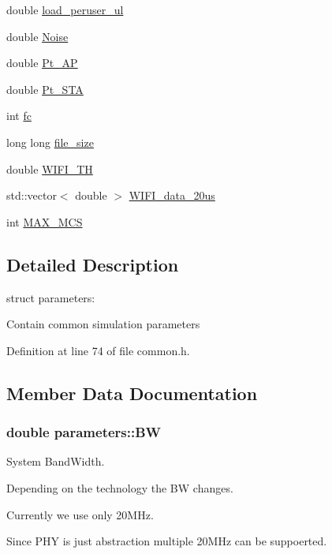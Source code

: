 \begin{DoxyCompactItemize}
\item 
double \hyperlink{structparameters_a56a8c884f07a495d1705f0c1afb34aac}{load\-\_\-peruser\-\_\-ul}
\item 
double \hyperlink{structparameters_a6cf4f2d340c4d03c138cee3460f047eb}{Noise}
\item 
double \hyperlink{structparameters_a4af7a6d10fd1012d16cba5f7b13c930b}{Pt\-\_\-\-A\-P}
\item 
double \hyperlink{structparameters_a52242f438292fd65f607c8789631d10d}{Pt\-\_\-\-S\-T\-A}
\item 
int \hyperlink{structparameters_afcbb78167d255c8c249b6e868ae34cb8}{fc}
\item 
long long \hyperlink{structparameters_a839992f2d6e75df2b71fa74147cd89fd}{file\-\_\-size}
\item 
double \hyperlink{structparameters_a7f13646d17a6dd826f944a905a96cbd7}{W\-I\-F\-I\-\_\-\-T\-H}
\item 
std\-::vector$<$ double $>$ \hyperlink{structparameters_a43e6f6e73d1ad0d57f816679cbbfd5a8}{W\-I\-F\-I\-\_\-data\-\_\-20us}
\item 
int \hyperlink{structparameters_ab2821a9be5274d77b2f4f76ff06b2e65}{M\-A\-X\-\_\-\-M\-C\-S}
\end{DoxyCompactItemize}


\subsection{Detailed Description}
struct parameters\-: \par
Contain common simulation parameters \par


Definition at line 74 of file common.\-h.



\subsection{Member Data Documentation}
\hypertarget{structparameters_ac5f5238606e728cd1d01a08113e36829}{
\subsubsection[{B\-W}]{\setlength{\rightskip}{0pt plus 5cm}double parameters\-::\-B\-W}}\label{structparameters_ac5f5238606e728cd1d01a08113e36829}
System Band\-Width. \par
Depending on the technology the B\-W changes. \par
Currently we use only 20\-M\-Hz. \par
Since P\-H\-Y is just abstraction multiple 20\-M\-Hz can be suppoerted. \par


